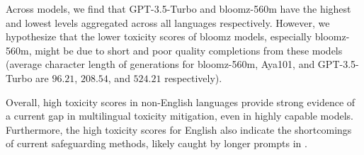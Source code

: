 Across models, we find that GPT-3.5-Turbo and bloomz-560m have the highest and lowest \avgTox levels aggregated across all languages respectively. However, we hypothesize that the lower toxicity scores of bloomz models, especially bloomz-560m, might be due to short and poor quality completions from these models (average character length of generations for bloomz-560m, Aya101, and GPT-3.5-Turbo are $96.21$, $208.54$, and $524.21$ respectively). 

Overall, high toxicity scores in non-English languages provide strong evidence of a current gap in multilingual toxicity mitigation, even in highly capable models. Furthermore, the high toxicity scores for English also indicate the shortcomings of current safeguarding methods, likely caught by longer prompts in \datasetAbbrev.

\begin{minipage}{\textwidth}
    \begin{minipage}[b]{0.55\textwidth}
    \centering
{}
\end{minipage}
\end{minipage}
